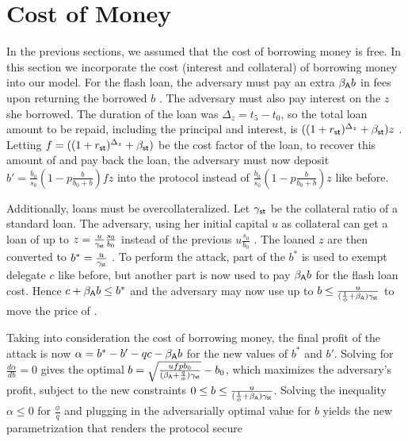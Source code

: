 
\section{Cost of Money}\label{sec:cost-of-money}

In the previous sections, we assumed that the cost of borrowing money is free.
In this section we incorporate the cost (interest and collateral) of borrowing money into our model.
For the flash loan, the adversary must pay an extra
$\beta_{\textsf{A}} b$ \asset in fees upon returning the borrowed $b$ \asset.
The adversary must also pay interest on the $z$ \stasset she borrowed.
The duration of the loan was $\Delta_z = t_5 - t_0$, so the
total loan amount to be repaid, including the principal and interest, is
$((1 + r_{\textsf{st}})^{\Delta_z} + \beta_{\textsf{st}}) z$ \stasset.
Letting $f = ((1 + r_{\textsf{st}})^{\Delta_z} + \beta_{\textsf{st}})$ be the cost factor
of the loan, to recover this amount of \stasset and pay back the loan, the adversary must now
deposit $b' = \frac{b_0}{s_0}(1 - p\frac{b}{b_0 + b}) f z$ \asset
into the protocol instead of $\frac{b_0}{s_0}(1 - p\frac{b}{b_0 + b}) z$ \asset like before.

Additionally, loans must be overcollateralized.
Let $\gamma_{\textsf{st}}$ be the collateral ratio of a standard \stasset loan.
The adversary, using her initial capital $u$ as collateral can get a loan of
up to $z = \frac{u}{\gamma_{\textsf{st}}} \frac{s_0}{b_0}$ \stasset
instead of the previous $u \frac{s_0}{b_0}$ \stasset.
The loaned $z$ \stasset are then converted to $b^*=\frac{u}{\gamma_{\textsf{st}}}$ \asset.
To perform the attack, part of the $b^*$ \asset is used to exempt delegate $c$ like
before, but another part is now used to pay $\beta_{\textsf{A}} b$ for the flash loan cost.
Hence $c + \beta_{\textsf{A}} b \leq b^*$ and the adversary may now use up to
$b \leq \frac{u}{(\frac{1}{\phi} + \beta_{\textsf{A}}) \gamma_{\textsf{st}}}$ to move the price
of \stasset.


Taking into consideration the cost of borrowing money, the final profit of the attack is now
$\alpha = b^* - b' - qc - \beta_{\textsf{A}} b$ for the new values of $b^*$ and $b'$.
Solving for $\frac{d\alpha}{db} = 0$ gives the optimal
$b = \sqrt{\frac{u f p b_0}{(\beta_{\textsf{A}} + \frac{q}{\phi})\gamma_{\textsf{st}}}} - b_0$,
which maximizes the adversary's profit, subject to the new constraints
$0 \leq b \leq \frac{u}{(\frac{1}{\phi} + \beta_{\textsf{A}}) \gamma_{\textsf{st}}}$.
Solving the inequality $\alpha \leq 0$ for $\frac{\phi}{q}$ and plugging in the adversarially optimal value for $b$
yields the new parametrization that renders the protocol secure

